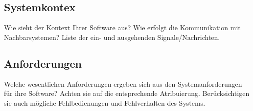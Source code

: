 \subsection{Systemkontex}

Wie sieht der Kontext Ihrer Software aus? Wie erfolgt die Kommunikation
mit Nachbarsystemen? Liste der ein- und ausgehenden Signale/Nachrichten.

\subsection{Anforderungen}

Welche wesentlichen Anforderungen ergeben sich aus den
Systemanforderungen für ihre Software? Achten sie auf die entsprechende
Atribuierung. Berücksichtigen sie auch mögliche Fehlbedienungen und
Fehlverhalten des Systems.
